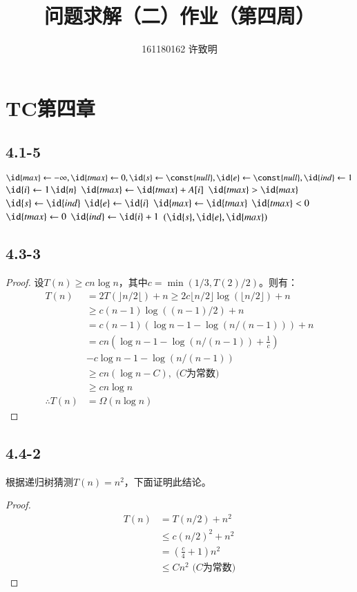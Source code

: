 \documentclass[twocolumn]{article}
\begin{document}
	\title{问题求解（二）作业（第四周）}\author{161180162 许致明}\maketitle
	\section*{TC第四章}
	\subsection*{4.1-5}
		\begin{codebox}
			\zi {}\li 
			$\id{max}\gets -\infty,\id{tmax}\gets 0,\id{s}\gets \const{null},\id{e}\gets \const{null},\id{ind}\gets 1$\li
			\For $\id{i}\gets 1$\To $\id{n}$\Do\li 
			$\id{tmax}\gets \id{tmax}+A[i]$\li  
			\If $\id{tmax}>\id{max}$\Then \li 
			$\id{s}\gets \id{ind}$\li
			$\id{e}\gets \id{i}$\li 
			$\id{max}\gets \id{tmax}$ 
			\End\li 
			\If $\id{tmax}<0$\Then\li 
			$\id{tmax}\gets 0$\li 
			$\id{ind}\gets\id{i}+1$ 
			\End
			\End\li 
			\Return $(\id{s},\id{e},\id{max})$
		\end{codebox}
	\subsection*{4.3-3}
	\begin{proof}
		设$T(n)\ge cn\log n$，其中$c=\min(1/3,T(2)/2)$。则有：
		\[
		\begin{aligned}
			T(n)&=2T(\rfloor n/2\lfloor)+n\ge 2c\lfloor n/2\rfloor\log (\lfloor n/2\rfloor)+n\\
			&\ge c(n-1)\log((n-1)/2)+n\\
			&=c(n-1)(\log n-1-\log(n/(n-1)))+n\\
			&=cn\left(\log n-1-\log(n/(n-1))+\frac{1}{c}\right)\\
			&-c\log n-1-\log (n/(n-1))\\
			&\ge cn(\log n-C),\text{ ($C$为常数)}\\
			&\ge cn\log n\\
			\therefore T(n)&=\Omega(n\log n)
		\end{aligned}
		\]
	\end{proof}
	\subsection*{4.4-2}
	根据递归树猜测$T(n)=n^2$，下面证明此结论。
	\begin{proof}
		\[
		\begin{aligned}
			T(n)&=T(n/2)+n^2\\
			&\le c(n/2)^2+n^2\\
			&=\left(\frac{c}{4}+1\right)n^2\\
			&\le Cn^2\text{ ($C$为常数)}
		\end{aligned}
		\]
	\end{proof}
\end{document}
